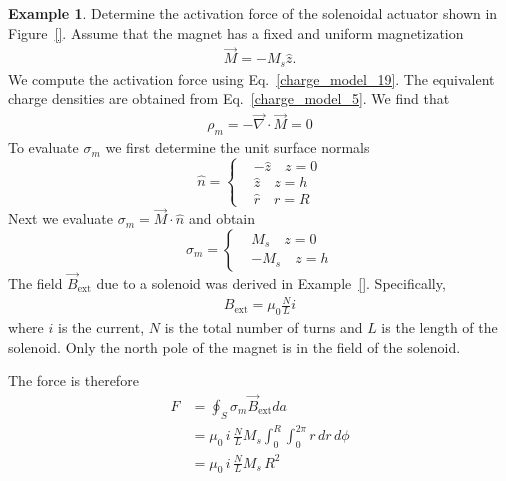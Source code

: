 \documentclass[11pt,a4paper,oneside]{book}
\numberwithin{equation}{section}
\theoremstyle{it}
\theoremstyle{definition}
\newtheorem{example}{Example}[section]
\begin{document}
\begin{example}
	Determine the activation force of the solenoidal actuator shown in Figure~\ref{}. Assume that the magnet has a fixed and uniform magnetization 
	\begin{equation*}\label{}
		{\begin{aligned}
				\vec{M} =-M_s\hat{z}.
		\end{aligned}}
	\end{equation*}
	We compute the activation force using Eq.~\eqref{charge_model_19}. The equivalent charge densities are obtained from Eq.~\eqref{charge_model_5}. We find that 
	\begin{equation*}\label{}
	{\begin{aligned}
			\rho_m =-\vec{\nabla}\cdot\vec{M}=0
	\end{aligned}}
	\end{equation*}
	To evaluate $\sigma_m$ we first determine the unit surface normals
	\begin{equation*}\label{}
		\hat{n} = \left\lbrace 
		\begin{aligned}
			&-\hat{z}\quad z=0 \\[6pt]	
			&\hat{z}\quad z=h \\[6pt]
			&\hat{r}\quad r=R 
		\end{aligned}\right. 
	\end{equation*} 
	Next we evaluate $\sigma_m=\vec{M}\cdot\hat{n}$ and obtain
	\begin{equation*}\label{}
	\sigma_m = \left\lbrace 
	\begin{aligned}
		&M_s\quad z=0 \\[6pt]	
		&-M_s\quad z=h 
	\end{aligned}\right. 
	\end{equation*} 	 
The field $\vec{B}_{\text{ext}}$ due to a solenoid was derived in Example~\ref{}. Specifically,
	\begin{equation*}\label{}
	\begin{aligned}
		B_{\text{ext}}=\mu_0\frac{N}{L}i
	\end{aligned}
	\end{equation*} 
where $i$ is the current, $N$ is the total number of turns and $L$ is the length of the solenoid. Only the north pole of the magnet is in the field of the solenoid.

The force is therefore
	\begin{equation*}\label{}
	\begin{aligned}
		F &= \oint_{S}\sigma_m\vec{B}_{\text{ext}}da \\[6pt]
		&= \mu_0\,i\,\frac{N}{L}M_s\int_{0}^{R}\int_{0}^{2\pi}r\,dr\,d\phi \\[6pt]
		&= \mu_0\,i\,\frac{N}{L}M_s\,R^2
	\end{aligned}
	\end{equation*} 
\end{example}
\end{document}
